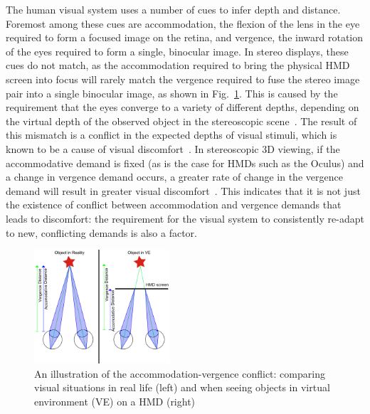 The human visual system uses a number of cues to infer depth and distance. Foremost among these cues are accommodation, the flexion of the lens in the eye required to form a focused image on the retina, and vergence, the inward rotation of the eyes required to form a single, binocular image. In stereo displays, these cues do not match, as the accommodation required to bring the physical HMD screen into focus will rarely match the vergence required to fuse the stereo image pair into a single binocular image, as shown in Fig.~\ref{fig:av-conflict}. This is caused by the requirement that the eyes converge to a variety of different depths, depending on the virtual depth of the observed object in the stereoscopic scene~\cite{rushton99}. The result of this mismatch is a conflict in the expected depths of visual stimuli, which is known to be a cause of visual discomfort~\cite{shibata11}. In stereoscopic 3D viewing, if the accommodative demand is fixed (as is the case for HMDs such as the Oculus) and a change in vergence demand occurs, a greater rate of change in the vergence demand will result in greater visual discomfort~\cite{kim14}. This indicates that it is not just the existence of conflict between accommodation and vergence demands that leads to discomfort: the requirement for the visual system to consistently re-adapt to new, conflicting demands is also a factor.\\ 

\begin{figure}
        \centering
            \includegraphics[width=0.45\textwidth]{images/vaconflict.png}
            \caption{An illustration of the accommodation-vergence conflict: comparing visual situations in real life (left) and when seeing objects in virtual environment (VE) on a HMD (right)}
            \label{fig:av-conflict}
\end{figure}

